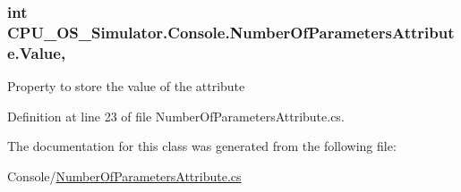 \subsubsection[{Value}]{\setlength{\rightskip}{0pt plus 5cm}int C\+P\+U\+\_\+\+O\+S\+\_\+\+Simulator.\+Console.\+Number\+Of\+Parameters\+Attribute.\+Value\hspace{0.3cm}{\ttfamily [get]}, {\ttfamily [set]}}\label{class_c_p_u___o_s___simulator_1_1_console_1_1_number_of_parameters_attribute_a7e083af44b45e3e68868d0d5d1991000}


Property to store the value of the attribute 



Definition at line 23 of file Number\+Of\+Parameters\+Attribute.\+cs.



The documentation for this class was generated from the following file\+:\begin{DoxyCompactItemize}
\item 
Console/\hyperlink{_number_of_parameters_attribute_8cs}{Number\+Of\+Parameters\+Attribute.\+cs}\end{DoxyCompactItemize}
